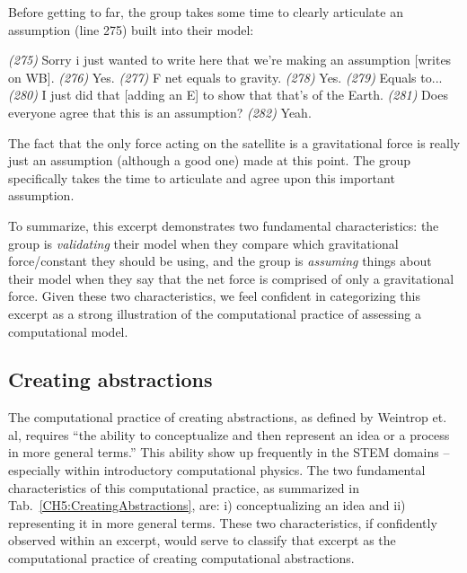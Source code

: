 \documentclass{msuphddissertation}
\begin{document}
\begin{doublespace}
Before getting to far, the group takes some time to clearly articulate an assumption (line 275) built into their model:
\begin{description}
\SA \textit{(275)} Sorry i just wanted to write here that we're making an assumption [writes on WB].
\SD \textit{(276)} Yes.
\SD \textit{(277)} F net equals to gravity.
\SD \textit{(278)} Yes.
\SD \textit{(279)} Equals to...
\SA \textit{(280)} I just did that [adding an E] to show that that's of the Earth.
\SA \textit{(281)} Does everyone agree that this is an assumption?	
\SC \textit{(282)} Yeah.
\end{description}  The fact that the only force acting on the satellite is a gravitational force is really just an assumption (although a good one) made at this point.  The group specifically takes the time to articulate and agree upon this important assumption.

To summarize, this excerpt demonstrates two fundamental characteristics: the group is \textit{validating} their model when they compare which gravitational force/constant they should be using, and the group is \textit{assuming} things about their model when they say that the net force is comprised of only a gravitational force.  Given these two characteristics, we feel confident in categorizing this excerpt as a strong illustration of the computational practice of assessing a computational model.

%
%
%
%
%
%
%
%
%
%
%
%
%
%
%
%

\subsection{Creating abstractions}\label{CH5:SecCreatingAbstractions}

The computational practice of creating abstractions, as defined by Weintrop et. al, requires ``the ability to conceptualize and then represent an idea or a process in more general terms.''  This ability show up frequently in the STEM domains -- especially within introductory computational physics.  The two fundamental characteristics of this computational practice, as summarized in Tab.~\ref{CH5:CreatingAbstractions}, are: i) conceptualizing an idea and ii) representing it in more general terms.  These two characteristics, if confidently observed within an excerpt, would serve to classify that excerpt as the computational practice of creating computational abstractions.


\end{doublespace}
\end{document}
